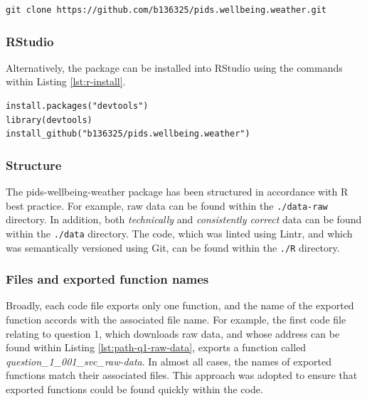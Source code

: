 \documentclass[12pt, oneside, openany]{book}
\begin{document}
\bigskip
\begin{lstlisting}[caption=Command to clone the pids.wellbeing.weather package., label={lst:git-clone}]
git clone https://github.com/b136325/pids.wellbeing.weather.git
\end{lstlisting}

\subsubsection*{RStudio}
Alternatively, the package can be installed into RStudio using the commands within Listing \ref{lst:r-install}.

\bigskip
\begin{lstlisting}[caption=Commands to install the pids.wellbeing.weather package.,  label={lst:r-install}]
install.packages("devtools")
library(devtools)
install_github("b136325/pids.wellbeing.weather")
\end{lstlisting}

\subsubsection*{Structure}
The pids-wellbeing-weather package has been structured in accordance with R best practice\cite{rPackages}. For example, raw data can be found within the \texttt{./data-raw} directory. In addition, both \emph{technically} and \emph{consistently correct} data can be found within the \texttt{./data} directory. The code, which was linted using Lintr\cite{lintr}, and which was semantically versioned\cite{semvar} using Git\cite{git}, can be found within the \texttt{./R} directory.

\subsubsection*{Files and exported function names}
Broadly, each code file exports only one function, and the name of the exported function accords with the associated file name. For example, the first code file relating to question 1, which downloads raw data, and whose address can be found within Listing \ref{lst:path-q1-raw-data}, exports a function called \emph{question\_1\_001\_svc\_raw-data}. In almost all cases, the names of exported functions match their associated files. This approach was adopted to ensure that exported functions could be found quickly within the code.
\end{document}

